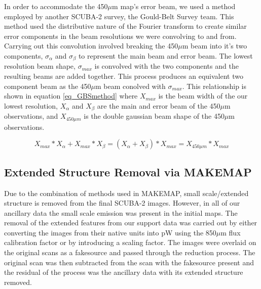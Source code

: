 In order to accommodate the 450$\mu$m map's error beam, we used a method employed by another SCUBA-2 survey, the Gould-Belt Survey team.  This method used the distributive nature of the Fourier transform to create similar error components in the beam resolutions we were convolving to and from.  Carrying out this convolution involved breaking the 450$\mu$m beam into it's two components, $\sigma_{\alpha}$ and $\sigma_{\beta}$ to represent the main beam and error beam.  The lowest resolution beam shape, $\sigma_{max}$ is convolved with the two components and the resulting beams are added together.  This process produces an equivalent two component beam as the 450$\mu$m beam conolved with $\sigma_{max}$.  This relationship is shown in equation \ref{eq_GBSmethod} where $X_{max}$ is the beam width of the our lowest resolution, $X_{\alpha}$ and $X_{\beta}$ are the main and error beam of the 450$\mu$m observations, and $X_{450\mu m}$ is the double gaussian beam shape of the 450$\mu$m observations.

\begin{equation} \label{eq_GBSmethod}
  X_{max} \ast X_{\alpha} + X_{max} \ast X_{\beta} = \left(X_{\alpha} + X_{\beta}\right) \ast X_{max} = X_{450\mu m} \ast X_{max}
\end{equation}

\subsection{Extended Structure Removal via MAKEMAP}\label{fakesource_sec}


Due to the combination of methods used in MAKEMAP, small scale/extended structure is removed from the final SCUBA-2 images.  However, in all of our ancillary data the small scale emission was present in the initial maps.  The removal of the extended features from our support data was carried out by either converting the images from their native units into pW using the 850$\mu$m flux calibration factor or by introducing a scaling factor.  The images were overlaid on the original scans as a fakesource and passed through the reduction process.  The original scan was then subtracted from the scan with the fakesource present and the residual of the process was the ancillary data with its extended structure removed.

